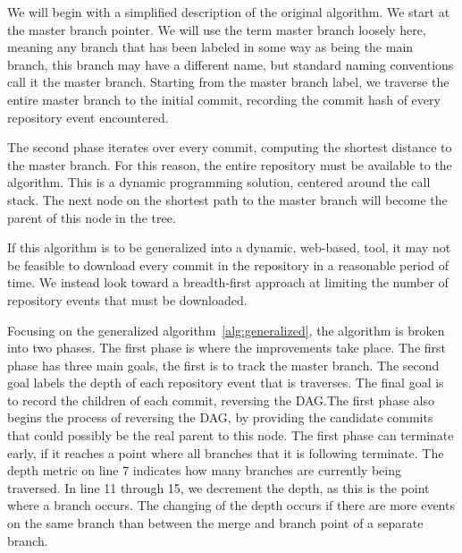 We will begin with a simplified description of the original algorithm.
We start at the master branch pointer. We will use the term master
branch loosely here, meaning any branch that has been labeled in some
way as being the main branch, this branch may have a different name, but
standard naming conventions call it the master branch. Starting from the
master branch label, we traverse the entire master branch to the initial
commit, recording the commit hash of every repository event encountered.

The second phase iterates over every commit, computing the shortest
distance to the master branch. For this reason, the entire repository
must be available to the algorithm. This is a dynamic programming
solution, centered around the call stack. The next node on the shortest
path to the master branch will become the parent of this node in the
tree.

If this algorithm is to be generalized into a dynamic, web-based, tool,
it may not be feasible to download every commit in the repository in a
reasonable period of time. We instead look toward a breadth-first
approach at limiting the number of repository events that must be
downloaded.

Focusing on the generalized algorithm~\ref{alg:generalized}, the
algorithm is broken into two phases. The first phase is where the
improvements take place. The first phase has three main goals, the first
is to track the master branch. The second goal labels the depth of each
repository event that is traverses. The final goal is to record the
children of each commit, reversing the DAG.\@ The first phase also
begins the process of reversing the DAG, by providing the candidate
commits that could possibly be the real parent to this node. The first
phase can terminate early, if it reaches a point where all branches that
it is following terminate. The depth metric on line 7 indicates how many
branches are currently being traversed. In line 11 through 15, we
decrement the depth, as this is the point where a branch occurs. The
changing of the depth occurs if there are more events on the same branch
than between the merge and branch point of a separate branch.

